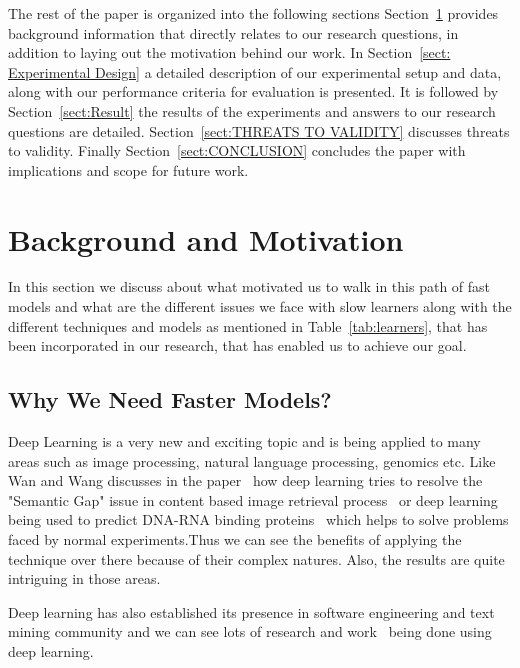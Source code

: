 \documentclass[sigconf]{acmart}
\theoremstyle{break}
\begin{document}
    The rest of the paper is organized into the following sections 
    Section~\ref{sect: Background and Motivation} provides background information  that directly relates to our research questions, in addition to laying out the motivation behind our work. In 
    Section~\ref{sect: Experimental Design} a detailed description of our experimental setup and data, along with our performance criteria for evaluation is presented. It is followed by 
    Section~\ref{sect:Result} the results of the experiments and answers to our research questions are detailed.
    Section~\ref{sect:THREATS TO VALIDITY} discusses threats to validity. Finally 
    Section~\ref{sect:CONCLUSION} concludes the paper with implications and scope for future work.
\section{Background and Motivation}
\label{sect: Background and Motivation}
    In this section we discuss about what motivated us to walk in this path of fast models and what are the different issues we face with slow learners along with the different techniques and models as mentioned in Table~\ref{tab:learners}, that has been incorporated in our research, that has enabled us to achieve our goal.
    
    \subsection{Why We Need Faster Models?}
    \label{sssec:Why We Need faster Models?}
    Deep Learning is a very new and exciting topic and is being applied to many areas such as image processing, natural language processing, genomics etc. Like Wan and Wang discusses in the paper~\cite{wan2014deep} how deep learning tries to resolve the "Semantic Gap" issue in content based image retrieval process~\cite{smeulders2000content} or deep learning being used to predict DNA-RNA binding proteins~\cite{alipanahi2015predicting} which helps to solve problems faced by normal experiments.Thus we can see the benefits of applying the technique over there because of their complex natures. Also, the results are quite intriguing in those areas.
    
    Deep learning has also established its presence in software engineering and text mining community and we can see lots of research and work~\cite{choetkiertikul2016deep,mou2016convolutional,white2016deep,white2015toward,yuan2014droid,yang2015deep} being done using deep learning. 
    
\end{document}
